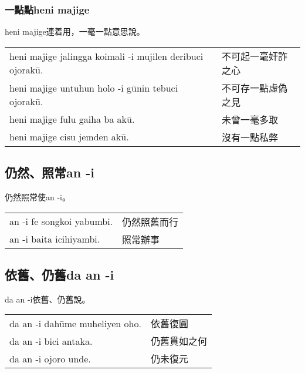 \documentclass{article}
\begin{document}
\subsubsection{一點點heni majige}
\noindent heni majige連着用，一毫一點意思說。
\begin{center}
    \begin{tabularx}{\textwidth}{XX}
        heni majige jalingga koimali -i mujilen deribuci ojorak\={u}. & 不可起一毫奸詐之心\\
        heni majige untuhun holo -i g\={u}nin tebuci ojorak\={u}. & 不可存一點虛偽之見\\
        heni majige fulu gaiha ba ak\={u}. & 未曾一毫多取\\
        heni majige cisu jemden ak\={u}. & 沒有一點私弊
    \end{tabularx}
\end{center}

\subsection{仍然、照常an -i}
\noindent 仍然照常使an -i。
\begin{center}
    \begin{tabularx}{\textwidth}{XX}
        an -i fe songkoi yabumbi. & 仍然照舊而行\\
        an -i baita icihiyambi. & 照常辦事
    \end{tabularx}
\end{center}

\subsection{依舊、仍舊da an -i}
\noindent da an -i依舊、仍舊說。
\begin{center}
    \begin{tabularx}{\textwidth}{XX}
        da an -i dah\={u}me muheliyen oho. & 依舊復圓\\
        da an -i bici antaka. & 仍舊貫如之何\\
        da an -i ojoro unde. & 仍未復元
    \end{tabularx}
\end{center}
\end{document}
